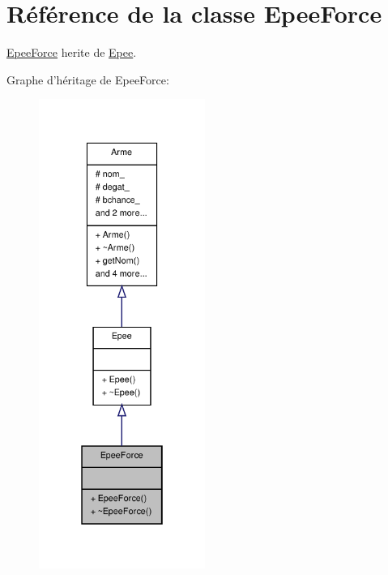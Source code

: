 \hypertarget{class_epee_force}{\section{Référence de la classe Epee\-Force}
\label{class_epee_force}
}


\hyperlink{class_epee_force}{Epee\-Force} herite de \hyperlink{class_epee}{Epee}.  




Graphe d'héritage de Epee\-Force\-:
\nopagebreak
\begin{figure}[H]
\begin{center}
\leavevmode
\includegraphics[width=154pt]{class_epee_force__inherit__graph}
\end{center}
\end{figure}


